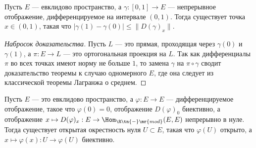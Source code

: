\documentclass[
	extrafontsizes,
	11pt,
	hyphens,
]{memoir}
\begin{document}

\begin{theorem}
\label{thm:LagrIneq}
Пусть \(E\) --- евклидово пространство, а \(\gamma : [0,1] \to E\) --- непрерывное отображение, дифференцируемое на интервале \((0,1)\).
Тогда существует точка \(x \in (0,1)\), такая что \(|\gamma(1) - \gamma(0)| \leq \lVert D(\gamma)_x \rVert\).
\end{theorem}

\begin{proof}[Набросок доказательства]
Пусть \(L\) --- это прямая, проходящая через \(\gamma(0)\) и \(\gamma(1)\), а \(\pi : E \to L\) --- это ортогональная проекция на \(L\). Так как дифференциалы \(\pi\) во всех точках имеют норму не больше \(1\), то замена \(\gamma\) на \(\pi \circ \gamma\) сводит доказательство теоремы к случаю одномерного \(E\), где она следует из классической теоремы Лагранжа о среднем.
\end{proof}


\begin{theorem}
Пусть \(E\) --- это евклидово пространство,
а \(\varphi : E \to E\) --- дифференцируемое отображение, такое что \(\varphi(0) = 0\), отображение \(D(\varphi)_0\) биективно,
а отображение
\(x \mapsto D(\varphi)_x : E \to \Hom_{\R\tn{-}\mr{mod}}(E,E)\) непрерывно в нуле.
Тогда существует открытая окрестность нуля \(U \subset E\), такая что \(\varphi(U)\) открыто, а \(x \mapsto \varphi(x) : U \to \varphi(U)\) биективно.
\end{theorem}
\end{document}
